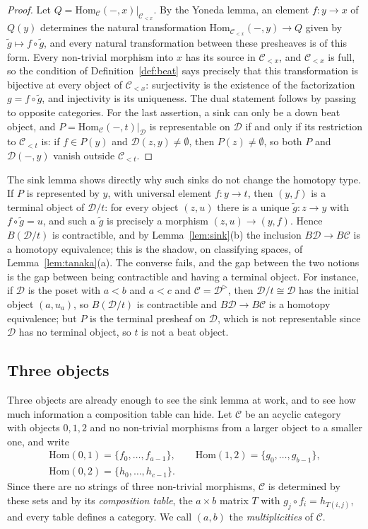 \documentclass[12pt]{amsart}
\theoremstyle{definition}
\theoremstyle{remark}
\newcommand{\CC}{\mathcal{C}}
\newcommand{\DD}{\mathcal{D}}
\newcommand{\co}{\colon}
\newcommand{\Hom}{\mathrm{Hom}}
\begin{document}
\begin{proof}
Let $Q=\Hom_\CC(-,x)|_{\CC_{<x}}$. By the Yoneda lemma, an element $f\co y\to x$ of $Q(y)$ determines the natural transformation $\Hom_{\CC_{<x}}(-,y)\to Q$ given by $\tilde g\mapsto f\circ\tilde g$, and every natural transformation between these presheaves is of this form. Every non-trivial morphism into $x$ has its source in $\CC_{<x}$, and $\CC_{<x}$ is full, so the condition of Definition~\ref{def:beat} says precisely that this transformation is bijective at every object of $\CC_{<x}$: surjectivity is the existence of the factorization $g=f\circ\tilde g$, and injectivity is its uniqueness. The dual statement follows by passing to opposite categories. For the last assertion, a sink can only be a down beat object, and $P=\Hom_\CC(-,t)|_\DD$ is representable on $\DD$ if and only if its restriction to $\CC_{<t}$ is: if $f\in P(y)$ and $\DD(z,y)\neq\emptyset$, then $P(z)\neq\emptyset$, so both $P$ and $\DD(-,y)$ vanish outside $\CC_{<t}$.
\end{proof}

The sink lemma shows directly why such sinks do not change the homotopy type. If $P$ is represented by $y$, with universal element $f\co y\to t$, then $(y,f)$ is a terminal object of $\DD/t$: for every object $(z,u)$ there is a unique $\tilde g\co z\to y$ with $f\circ\tilde g=u$, and such a $\tilde g$ is precisely a morphism $(z,u)\to(y,f)$. Hence $B(\DD/t)$ is contractible, and by Lemma~\ref{lem:sink}(b) the inclusion $B\DD\to B\CC$ is a homotopy equivalence; this is the shadow, on classifying spaces, of Lemma~\ref{lem:tanaka}(a). The converse fails, and the gap between the two notions is the gap between being contractible and having a terminal object. For instance, if $\DD$ is the poset with $a<b$ and $a<c$ and $\CC=\DD^{\triangleright}$, then $\DD/t\cong\DD$ has the initial object $(a,u_a)$, so $B(\DD/t)$ is contractible and $B\DD\to B\CC$ is a homotopy equivalence; but $P$ is the terminal presheaf on $\DD$, which is not representable since $\DD$ has no terminal object, so $t$ is not a beat object.

\subsection{Three objects}\label{subsec:three}

Three objects are already enough to see the sink lemma at work, and to see how much information a composition table can hide. Let $\CC$ be an acyclic category with objects $0,1,2$ and no non-trivial morphisms from a larger object to a smaller one, and write
\begin{gather*}
\Hom(0,1)=\{f_0,\dots,f_{a-1}\},\qquad\Hom(1,2)=\{g_0,\dots,g_{b-1}\},\\
\Hom(0,2)=\{h_0,\dots,h_{c-1}\}.
\end{gather*}
Since there are no strings of three non-trivial morphisms, $\CC$ is determined by these sets and by its \emph{composition table}, the $a\times b$ matrix $T$ with $g_j\circ f_i=h_{T(i,j)}$, and every table defines a category. We call $(a,b)$ the \emph{multiplicities} of $\CC$.
\end{document}
